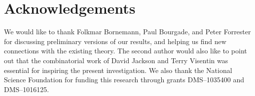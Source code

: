 \documentclass[pdftex, oneside, 10pt, letterpaper]{amsart}
\theoremstyle{plain}
\theoremstyle{definition}
\theoremstyle{remark}
\begin{document}
\section*{Acknowledgements}
We would like to thank Folkmar Bornemann, Paul Bourgade, and Peter
Forrester for discussing preliminary versions of our results, and
helping us find new connections with the existing theory.  The second
author would also like to point out that the combinatorial work of
David Jackson and Terry Visentin was essential for inspiring the
present investigation.  We also thank the National Science Foundation for
funding this research through grants DMS--1035400 and  DMS--1016125.



\end{document}
